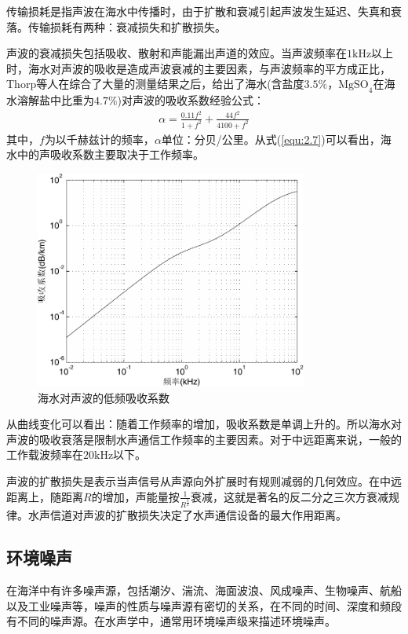传输损耗是指声波在海水中传播时，由于扩散和衰减引起声波发生延迟、失真和衰落。传输损耗有两种：衰减损失和扩散损失。

声波的衰减损失包括吸收、散射和声能漏出声道的效应。当声波频率在$1\mbox{kHz}$以上时，海水对声波的吸收是造成声波衰减的主要因素，与声波频率的平方成正比，Thorp等人在综合了大量的测量结果之后，给出了海水(含盐度$3.5\%$，$\mbox{MgSO}_4$在海水溶解盐中比重为$4.7\%$)对声波的吸收系数经验公式：
\begin{eqnarray}
    \alpha=\frac{0.11f^2}{1+f^2}+\frac{44f^2}{4100+f^2}
    \label{equ:2.7}
\end{eqnarray}
其中，$f$为以千赫兹计的频率，$\alpha$单位：分贝/公里。从式(\ref{equ:2.7})可以看出，海水中的声吸收系数主要取决于工作频率。
\begin{figure}[htb]
  \begin{center}
    \includegraphics[width=0.8\textwidth]{images/alphacoe.pdf}
  \end{center}
  \caption{海水对声波的低频吸收系数}
  \label{fig:2.1}
\end{figure}
从曲线变化可以看出：随着工作频率的增加，吸收系数是单调上升的。所以海水对声波的吸收衰落是限制水声通信工作频率的主要因素。对于中远距离来说，一般的工作载波频率在$20\mbox{kHz}$以下。

声波的扩散损失是表示当声信号从声源向外扩展时有规则减弱的几何效应。在中远距离上，随距离$R$的增加，声能量按$\frac{1}{R^{\frac{3}{2}}}$衰减，这就是著名的反二分之三次方衰减规律。水声信道对声波的扩散损失决定了水声通信设备的最大作用距离。
\subsection{环境噪声}
在海洋中有许多噪声源，包括潮汐、湍流、海面波浪、风成噪声、生物噪声、航船以及工业噪声等，噪声的性质与噪声源有密切的关系，在不同的时间、深度和频段有不同的噪声源。在水声学中，通常用环境噪声级来描述环境噪声。

